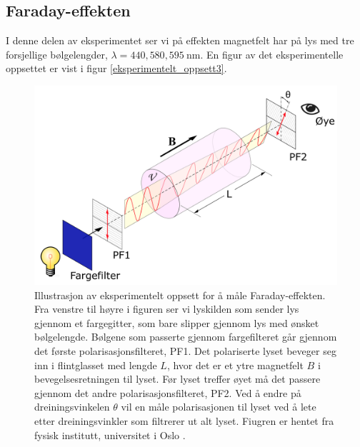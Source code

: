\documentclass[%
 reprint,
nofootinbib,
aps,
]{revtex4-1}
\begin{document}
\subsection{Faraday-effekten}
I denne delen av eksperimentet ser vi på effekten magnetfelt har på lys med tre forsjellige bølgelengder, $\lambda = 440, 580, \SI{595}{\nano\meter}$. En figur av det eksperimentelle oppsettet er vist i figur \vref{eksperimentelt_oppsett3}.
\begin{figure}[h!]
  \centering
  \includegraphics[scale=0.27]{oppsett3.png}
  \caption{Illustrasjon av eksperimentelt oppsett for å måle Faraday-effekten. Fra venstre til høyre i figuren ser vi lyskilden som sender lys gjennom et fargegitter, som bare slipper gjennom lys med ønsket bølgelengde. Bølgene som passerte gjennom fargefilteret går gjennom det første polarisasjonsfilteret, PF1. Det polariserte lyset beveger seg inn i flintglasset med lengde $L$, hvor det er et ytre magnetfelt $B$ i bevegelsesretningen til lyset. Før lyset treffer øyet må det passere gjennom det andre polarisasjonsfilteret, PF2. Ved å endre på dreiningsvinkelen $\theta$ vil en måle polarisasjonen til lyset ved å lete etter dreiningsvinkler som filtrerer ut alt lyset. Fiugren er hentet fra fysisk institutt, universitet i Oslo \cite{oppgave}.}
  \label{eksperimentelt_oppsett3}
\end{figure}
\end{document}
